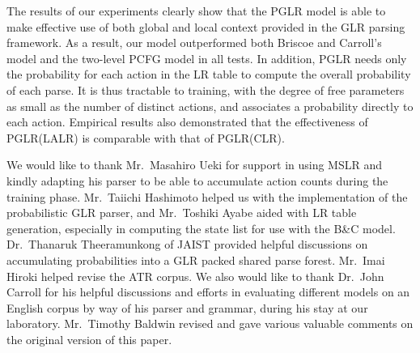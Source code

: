 The results of our experiments clearly show that the PGLR model is able
to make effective use of both global and local context provided in the
GLR parsing framework. As a result, our model outperformed both Briscoe
and Carroll's model and the two-level PCFG model in all tests. In
addition, PGLR needs only the probability for each action in the LR
table to compute the overall probability of each parse. It is thus
tractable to training, with the degree of free parameters as small as
the number of distinct actions, and associates a probability directly to
each action. Empirical results also demonstrated that the effectiveness of
PGLR(LALR) is comparable with that of PGLR(CLR).

\acknowledgment
We would like to thank Mr.~Masahiro Ueki for support in using MSLR and
kindly adapting his parser to be able to accumulate action counts during
the training phase. Mr.~Taiichi Hashimoto helped us with the
implementation of the probabilistic GLR parser, and Mr.~Toshiki Ayabe
aided with LR table generation, especially in computing the state list
for use with the B\&C model. Dr.~Thanaruk Theeramunkong of JAIST
provided helpful discussions on accumulating probabilities into a GLR
packed shared parse forest. Mr.~Imai Hiroki helped revise the ATR
corpus. We also would like to thank Dr.~John Carroll for his helpful
discussions and efforts in evaluating different models on an English
corpus by way of his parser and grammar, during his stay at our
laboratory. Mr.~Timothy Baldwin revised and gave various valuable
comments on the original version of this paper.

